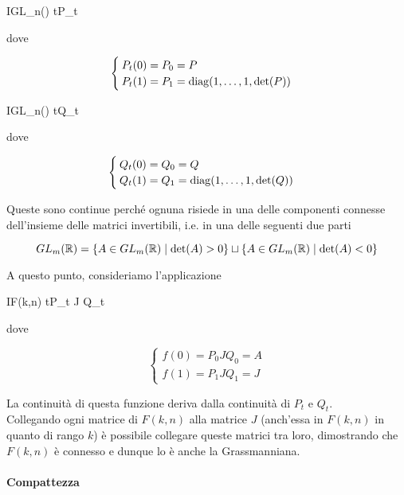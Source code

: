 	{I}{GL_{n}(\R)}
	{t}{P_{t}}

dove

\begin{equation}
	\begin{cases}
		P_{t}(0) = P_{0} = P\\
		P_{t}(1) = P_{1} = \operatorname{diag}(1,\dots,1,\det(P))
	\end{cases}
\end{equation}

	{I}{GL_{n}(\R)}
	{t}{Q_{t}}

dove

\begin{equation}
	\begin{cases}
		Q_{t}(0) = Q_{0} = Q\\
		Q_{t}(1) = Q_{1} = \operatorname{diag}(1,\dots,1,\det(Q))
	\end{cases}
\end{equation}

Queste sono continue perché ognuna risiede in una delle componenti connesse dell'insieme delle matrici invertibili, i.e. in una delle seguenti due parti

\begin{equation}
	GL_{m}(\mathbb{R}) = \{ A \in GL_{m}(\mathbb{R}) \mid \det(A) > 0 \} \sqcup \{ A \in GL_{m}(\mathbb{R}) \mid \det(A) < 0 \}
\end{equation}

A questo punto, consideriamo l'applicazione

	{I}{F(k,n)}
	{t}{P_{t} J Q_{t}}

dove

\begin{equation}
	\begin{cases}
		f(0) = P_{0} J Q_{0} = A\\
		f(1) = P_{1} J Q_{1} = J
	\end{cases}
\end{equation}

La continuità di questa funzione deriva dalla continuità di $ P_{t} $ e $ Q_{t} $.\\
Collegando ogni matrice di $ F(k,n) $ alla matrice $ J $ (anch'essa in $ F(k,n) $ in quanto di rango $ k $) è possibile collegare queste matrici tra loro, dimostrando che $ F(k,n) $ è connesso e dunque lo è anche la Grassmanniana.

\paragraph{Compattezza}

